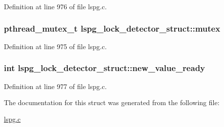 Definition at line 976 of file lspg.\-c.

\hypertarget{structlspg__lock__detector__struct_ab5ab5534b376a8fbafdd0b54cec4483c}{
\subsubsection[{mutex}]{\setlength{\rightskip}{0pt plus 5cm}pthread\-\_\-mutex\-\_\-t lspg\-\_\-lock\-\_\-detector\-\_\-struct\-::mutex}}\label{structlspg__lock__detector__struct_ab5ab5534b376a8fbafdd0b54cec4483c}


Definition at line 975 of file lspg.\-c.

\hypertarget{structlspg__lock__detector__struct_a62373414b815fe178edd8522b3bd4d78}{
\subsubsection[{new\-\_\-value\-\_\-ready}]{\setlength{\rightskip}{0pt plus 5cm}int lspg\-\_\-lock\-\_\-detector\-\_\-struct\-::new\-\_\-value\-\_\-ready}}\label{structlspg__lock__detector__struct_a62373414b815fe178edd8522b3bd4d78}


Definition at line 977 of file lspg.\-c.



The documentation for this struct was generated from the following file\-:\begin{DoxyCompactItemize}
\item 
\hyperlink{lspg_8c}{lspg.\-c}\end{DoxyCompactItemize}
